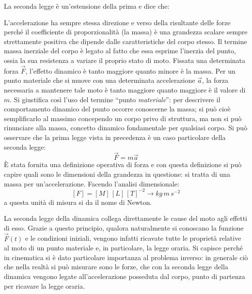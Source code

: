 \documentclass[10pt,a4paper]{book}
\begin{document}
La seconda legge è un'estensione della prima e dice che:

\noindent{}

L'accelerazione ha sempre stessa direzione e verso della risultante delle forze perché il coefficiente di proporzionalità (la massa) è una grandezza scalare sempre strettamente positiva che dipende dalle caratteristiche del corpo stesso. Il termine massa inerziale del corpo è legato al fatto che essa esprime l'inerzia del punto, ossia la sua resistenza a variare il proprio stato di moto. Fissata una determinata forza $\vec{F}$, l'effetto dinamico è tanto maggiore quanto minore è la massa. Per un punto materiale che si muove con una determinata accelerazione $\vec{a}$, la forza necessaria a mantenere tale moto è tanto maggiore quanto maggiore è il valore di $m$. Si giustifica così l'uso del termine “punto \emph{materiale}”: per descrivere il comportamento dinamico del punto occorre conoscerne la massa; si può cioè semplificarlo al massimo concependo un corpo privo di struttura, ma non si può rinunciare alla massa, concetto dinamico fondamentale per qualsiasi corpo.  Si può osservare che la prima legge vista in precedenza è un caso particolare della seconda legge:
\begin{equation}
	\vec{F}=m\vec{a}
\end{equation}
È stata fornita una definizione operativa di forza e con questa definizione si può capire quali sono le dimensioni della grandezza in questione: si tratta di una massa per un'accelerazione. Facendo l'analisi dimensionale:
\[
	[F]=[M]\,[L]\,[T]^{-2} \to kg\,m\,s^{-2}
\]
a questa unità di misura si da il nome di Newton.

La seconda legge della dinamica collega direttamente le cause del moto agli effetti di esso. Grazie a questo principio, qualora naturalmente si conoscano la funzione $\vec{F}(t)$ e le condizioni iniziali, vengono infatti ricavate tutte le proprietà relative al moto di un punto materiale e, in particolare, la legge oraria.  Si capisce perché in cinematica si è dato particolare importanza al problema inverso: in generale ciò che nella realtà si può misurare sono le forze, che con la seconda legge della dinamica vengono legate all'accelerazione posseduta dal corpo, punto di partenza per ricavare la legge oraria.
\end{document}
